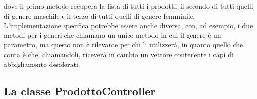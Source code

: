 \begin{Shaded}
\begin{Highlighting}[]
 

      
         \OperatorTok{=} \OtherTok{;}
         \OperatorTok{=} \NormalTok{)}\OtherTok{;}
         \OtherTok{;}
\NormalTok{    \}}

      
         \OperatorTok{=} \OtherTok{;}
         \OperatorTok{=} \NormalTok{)}\OtherTok{;}
         \OtherTok{;}
\NormalTok{    \}}

      
         \OperatorTok{=} \OtherTok{;}
         \OperatorTok{=} \NormalTok{)}\OtherTok{;}
         \OtherTok{;}
\NormalTok{    \}}
\NormalTok{\}}
\end{Highlighting}
\end{Shaded}

dove il primo metodo recupera la lista di tutti i prodotti, il secondo
di tutti quelli di genere maschile e il terzo di tutti quelli di genere
femminile. L'implementazione specifica potrebbe essere anche diversa,
con, ad esempio, i due metodi per i generi che chiamano un unico metodo
in cui il genere è un parametro, ma questo non è rilevante per chi li
utilizzerà, in quanto quello che conta è che, chiamandoli, riceverà in
cambio un vettore contenente i capi di abbigliamento desiderati.

\hypertarget{la-classe-prodottocontroller}{%
\subsection{La classe
ProdottoController}\label{la-classe-prodottocontroller}}

